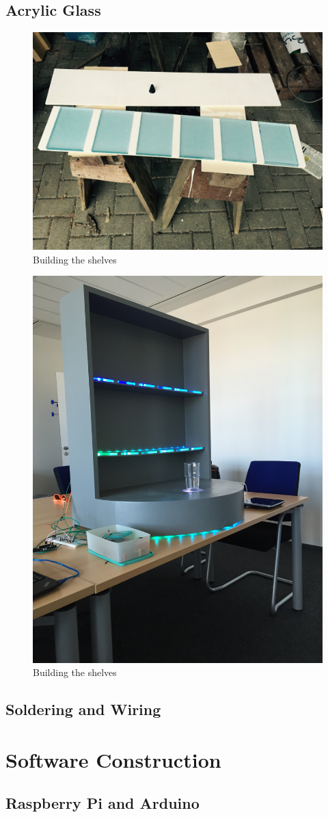 \documentclass{acm_proc_article-sp}
\begin{document}
\subsection{Acrylic Glass}

\begin{figure}[htbp] 
  \centering
     \includegraphics[width=0.5\linewidth]{pictures/plexiglass.jpg}
  \caption{Building the shelves}
  \label{fig:building_shelves}
\end{figure}

\begin{figure}[htbp] 
  \centering
     \includegraphics[width=0.5\linewidth]{pictures/iluminated_shelves.jpg}
  \caption{Building the shelves}
  \label{fig:iluminated_shelves}
\end{figure}


\subsection{Soldering and Wiring}
\section{Software Construction}
\subsection{Raspberry Pi and Arduino}
\end{document}
